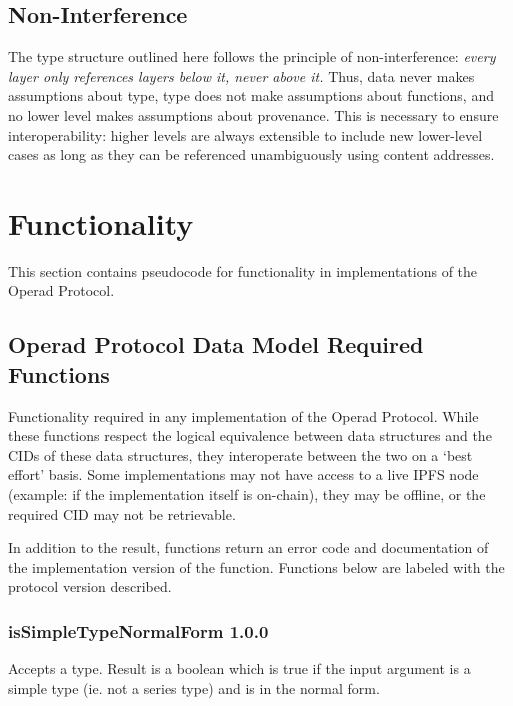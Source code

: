 \documentclass[9pt, oneside]{article}   	%
\begin{document}
\vspace{.25 cm}

\subsection{Non-Interference}\label{nonInterference}
The type structure outlined here follows the principle of non-interference: \textit{every layer only references layers below it, never above it.} Thus, data never makes assumptions about type, type does not make assumptions about functions, and no lower level makes assumptions about provenance. This is necessary to ensure interoperability: higher levels are always extensible to include new lower-level cases as long as they can be referenced unambiguously using content addresses. 


\section{Functionality}\label{pseudocode}

This section contains pseudocode for functionality in implementations of the Operad Protocol.

\subsection{Operad Protocol Data Model Required Functions}\label{dataModelFuncs}

Functionality required in any implementation of the Operad Protocol. While these functions respect the logical equivalence between data structures and the CIDs of these data structures, they interoperate between the two on a `best effort' basis. Some implementations may not have access to a live IPFS node (example: if the implementation itself is on-chain), they may be offline, or the required CID may not be retrievable.

In addition to the result, functions return an error code and documentation of the implementation version of the function. Functions below are labeled with the protocol version described.

\newpage
\subsubsection{isSimpleTypeNormalForm 1.0.0}\label{isSimpleTypeNormalForm_code}

Accepts a type. Result is a boolean which is true if the input argument is a simple type (ie. not a series type) and is in the normal form.
\end{document}
